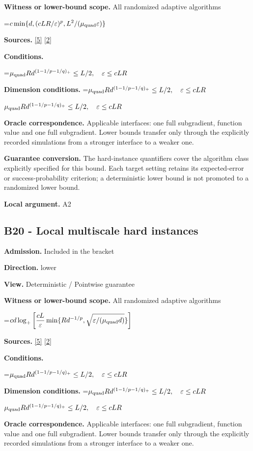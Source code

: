 \documentclass[10pt,a4paper]{article}
\newcommand{\AtlasMath}[1]{\par\begingroup\centering\setbox0=\hbox{$\displaystyle #1$}\ifdim\wd0>1.4\linewidth\typeout{ATLAS WIDE FORMULA: \the\wd0}\fi\ifdim\wd0>\linewidth\resizebox{\linewidth}{!}{\box0}\else\box0\fi\par\endgroup}
\newcommand{\AtlasInlineMath}[1]{\begingroup\setbox0=\hbox{$#1$}\ifdim\wd0>.4\linewidth\endgroup\AtlasMath{#1}\else\endgroup$#1$\fi}
\begin{document}
\textbf{Witness or lower-bound scope.} All randomized adaptive algorithms

\AtlasMath{c\min\{d,(cLR/\varepsilon)^p,L^2/(\mu_{\rm quad}\varepsilon)\}}
\textbf{Sources.} \href{https://arxiv.org/pdf/1407.5144}{[5]} \href{https://arxiv.org/pdf/1401.1792}{[2]}

\textbf{Conditions.} 
\AtlasMath{\mu_{\rm quad}R d^{(1-1/p-1/q)_+}\le L/2,\quad\varepsilon\le cLR}


\textbf{Dimension conditions.} \AtlasInlineMath{\mu_{\rm quad}R d^{(1-1/p-1/q)_+}\le L/2,\quad\varepsilon\le cLR}

\textbf{Oracle correspondence.} Applicable interfaces: one full subgradient, function value and one full subgradient. Lower bounds transfer only through the explicitly recorded simulations from a stronger interface to a weaker one.

\textbf{Guarantee conversion.} The hard-instance quantifiers cover the algorithm class explicitly specified for this bound. Each target setting retains its expected-error or success-probability criterion; a deterministic lower bound is not promoted to a randomized lower bound.

\textbf{Local argument.} A2

\subsection{B20 - Local multiscale hard instances}
\textbf{Admission.} Included in the bracket

\textbf{Direction.} lower

\textbf{View.} Deterministic / Pointwise guarantee

\textbf{Witness or lower-bound scope.} All randomized adaptive algorithms

\AtlasMath{cd\log_+\left[\frac{cL}{\varepsilon}\min\{Rd^{-1/p},\sqrt{\varepsilon/(\mu_{\rm quad}d)}\}\right]}
\textbf{Sources.} \href{https://arxiv.org/pdf/1407.5144}{[5]} \href{https://arxiv.org/pdf/1401.1792}{[2]}

\textbf{Conditions.} 
\AtlasMath{\mu_{\rm quad}R d^{(1-1/p-1/q)_+}\le L/2,\quad\varepsilon\le cLR}


\textbf{Dimension conditions.} \AtlasInlineMath{\mu_{\rm quad}R d^{(1-1/p-1/q)_+}\le L/2,\quad\varepsilon\le cLR}

\textbf{Oracle correspondence.} Applicable interfaces: one full subgradient, function value and one full subgradient. Lower bounds transfer only through the explicitly recorded simulations from a stronger interface to a weaker one.
\end{document}
